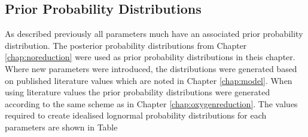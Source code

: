 \subsection{Prior Probability Distributions}

As described previously all parameters much have an associated prior probability distribution. The posterior probability distributions from Chapter \ref{chap:noreduction} were used as prior probability distributions in theis chapter. Where new parameters were introduced, the distributions were generated based on published literature values which are noted in Chapter \ref{chap:model}. When using literature values the prior probability distributions were generated according to the same scheme as in Chapter \ref{chap:oxygenreduction}. The values required to create idealised lognormal probability distributions for each parameters are shown in Table

